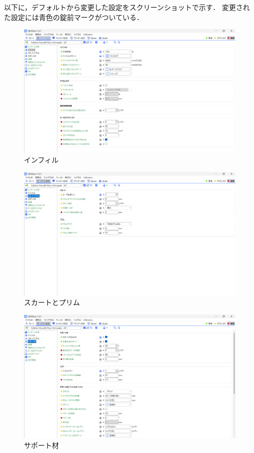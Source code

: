 以下に，デフォルトから変更した設定をスクリーンショットで示す．
変更された設定には青色の錠前マークがついている．

\begin{figure}[H]
	\centering
		\includegraphics[scale=0.25]{./figure/設定1.png}
		\caption{インフィル}
		\label{fig:slice1}
\end{figure}

\begin{figure}[H]
	\centering
		\includegraphics[scale=0.25]{./figure/設定2.png}
		\caption{スカートとプリム}
		\label{fig:slice2}
\end{figure}

\begin{figure}[H]
	\centering
		\includegraphics[scale=0.25]{./figure/設定3.png}
		\caption{サポート材}
		\label{fig:slice3}
\end{figure}

